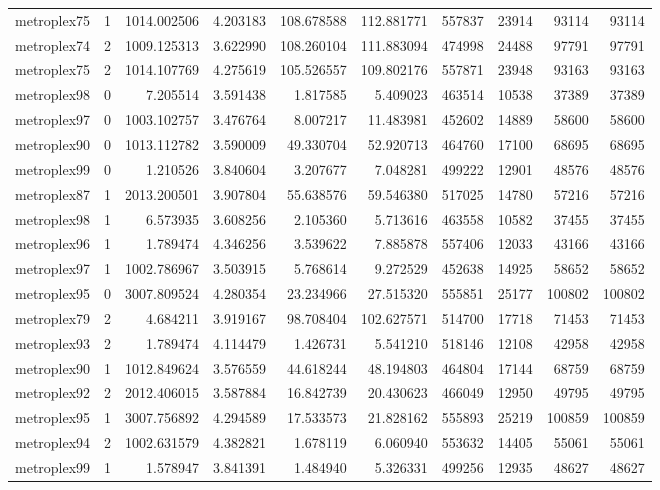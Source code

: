 \documentclass[../../../thesis.tex]{subfiles}
\begin{document}
\begin{longtable}{|l|r|r|r|r|r|r|r|r|r|}
metroplex75 & 1 & 1014.002506 & 4.203183 & 108.678588 & 112.881771 & 557837 & 23914 & 93114 & 93114 \\
metroplex74 & 2 & 1009.125313 & 3.622990 & 108.260104 & 111.883094 & 474998 & 24488 & 97791 & 97791 \\
metroplex75 & 2 & 1014.107769 & 4.275619 & 105.526557 & 109.802176 & 557871 & 23948 & 93163 & 93163 \\
metroplex98 & 0 & 7.205514 & 3.591438 & 1.817585 & 5.409023 & 463514 & 10538 & 37389 & 37389 \\
metroplex97 & 0 & 1003.102757 & 3.476764 & 8.007217 & 11.483981 & 452602 & 14889 & 58600 & 58600 \\
metroplex90 & 0 & 1013.112782 & 3.590009 & 49.330704 & 52.920713 & 464760 & 17100 & 68695 & 68695 \\
metroplex99 & 0 & 1.210526 & 3.840604 & 3.207677 & 7.048281 & 499222 & 12901 & 48576 & 48576 \\
metroplex87 & 1 & 2013.200501 & 3.907804 & 55.638576 & 59.546380 & 517025 & 14780 & 57216 & 57216 \\
metroplex98 & 1 & 6.573935 & 3.608256 & 2.105360 & 5.713616 & 463558 & 10582 & 37455 & 37455 \\
metroplex96 & 1 & 1.789474 & 4.346256 & 3.539622 & 7.885878 & 557406 & 12033 & 43166 & 43166 \\
metroplex97 & 1 & 1002.786967 & 3.503915 & 5.768614 & 9.272529 & 452638 & 14925 & 58652 & 58652 \\
metroplex95 & 0 & 3007.809524 & 4.280354 & 23.234966 & 27.515320 & 555851 & 25177 & 100802 & 100802 \\
metroplex79 & 2 & 4.684211 & 3.919167 & 98.708404 & 102.627571 & 514700 & 17718 & 71453 & 71453 \\
metroplex93 & 2 & 1.789474 & 4.114479 & 1.426731 & 5.541210 & 518146 & 12108 & 42958 & 42958 \\
metroplex90 & 1 & 1012.849624 & 3.576559 & 44.618244 & 48.194803 & 464804 & 17144 & 68759 & 68759 \\
metroplex92 & 2 & 2012.406015 & 3.587884 & 16.842739 & 20.430623 & 466049 & 12950 & 49795 & 49795 \\
metroplex95 & 1 & 3007.756892 & 4.294589 & 17.533573 & 21.828162 & 555893 & 25219 & 100859 & 100859 \\
metroplex94 & 2 & 1002.631579 & 4.382821 & 1.678119 & 6.060940 & 553632 & 14405 & 55061 & 55061 \\
metroplex99 & 1 & 1.578947 & 3.841391 & 1.484940 & 5.326331 & 499256 & 12935 & 48627 & 48627 \\

\end{longtable}
\end{document}
